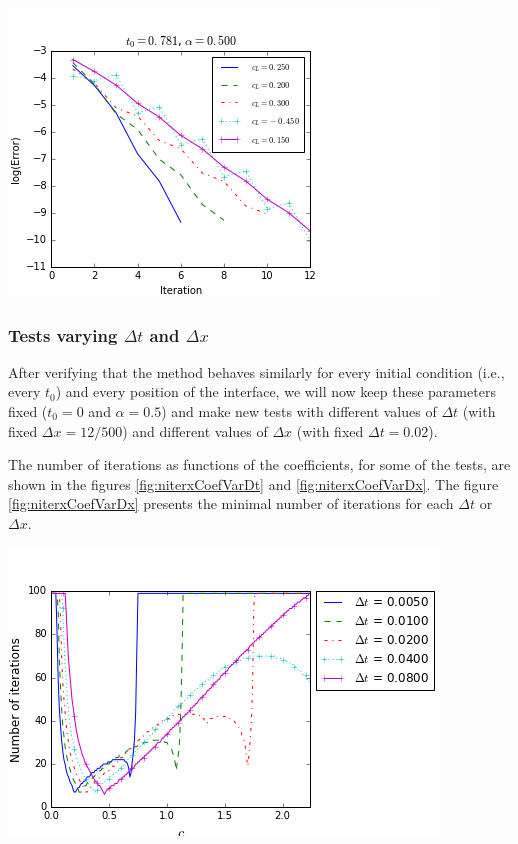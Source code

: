 \begingroup
\begin{center}
\includegraphics[scale=.5]{figures/errorEvolutionFixedT0BNegativeCoefCorrectN.png}
\end{center}
\endgroup

\subsubsection{Tests varying $\Delta t$ and $\Delta x$}

\indent After verifying that the method behaves similarly for every initial condition (i.e., every $t_0$) and every position of the interface, we will now keep these parameters fixed ($t_0 = 0$ and $\alpha = 0.5$) and make new tests with different values of $\Delta t$ (with fixed $\Delta x = 12/500$) and different values of $\Delta x$ (with fixed $\Delta t = 0.02$).

\indent The number of iterations as functions of the coefficients, for some of the tests, are shown in the figures \ref{fig:niterxCoefVarDt} and \ref{fig:niterxCoefVarDx}. The figure \ref{fig:niterxCoefVarDx} presents the minimal number of iterations for each $\Delta t$ or $\Delta x$. 

\begingroup
\begin{center}
	\includegraphics[scale=.5]{figures/NiterxCoefVarDtdx250CorrectN.png}
\end{center}
\endgroup

